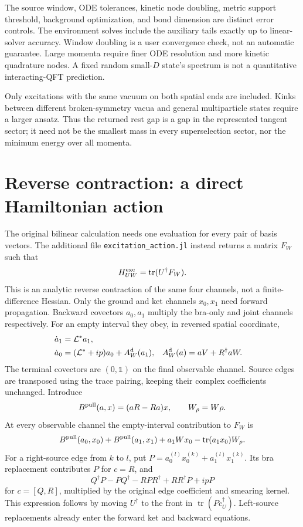 \documentclass[11pt]{article}
\newcommand{\tr}{\operatorname{tr}}
\newcommand{\Id}{\mathbb{1}}
\newcommand{\LL}{\mathcal{L}}
\begin{document}
The source window, ODE tolerances, kinetic node doubling, metric support
threshold, background optimization, and bond dimension are distinct error
controls. The environment solves include the auxiliary tails exactly up to
linear-solver accuracy. Window doubling is a user convergence check, not an
automatic guarantee. Large momenta require finer ODE resolution and more
kinetic quadrature nodes. A fixed random small-$D$ state's spectrum is not
a quantitative interacting-QFT prediction.

Only excitations with the same vacuum on both spatial ends are included.
Kinks between different broken-symmetry vacua and general multiparticle
states require a larger ansatz. Thus the returned rest gap is a gap in the
represented tangent sector; it need not be the smallest mass in every
superselection sector, nor the minimum energy over all momenta.


\section{Reverse contraction: a direct Hamiltonian action}
The original bilinear calculation needs one evaluation for every pair of
basis vectors. The additional file \texttt{excitation\_action.jl} instead
returns a matrix $F_W$ such that
\begin{equation}
 H^{\rm exc}_{UW}=\tr(U^\dagger F_W).
\end{equation}
This is an analytic reverse contraction of the same four channels, not a
finite-difference Hessian. Only the ground and ket channels $x_0,x_1$ need
forward propagation. Backward covectors $a_0,a_1$ multiply the bra-only and
joint channels respectively. For an empty interval they obey, in reversed
spatial coordinate,
\begin{align}
 \dot a_1&=\LL^*a_1,\\
 \dot a_0&=(\LL^*+ip)a_0+A_W^{\rm d}(a_1),
 &A_W^{\rm d}(a)&=aV+R^\dagger aW.
\end{align}
The terminal covectors are $(0,\Id)$ on the final observable channel.
Source edges are transposed using the trace pairing, keeping their complex
coefficients unchanged. Introduce
\begin{equation}
 B^{\rm pull}(a,x)=(aR-Ra)x,\qquad W_\rho=W\rho.
\end{equation}
At every observable channel the empty-interval contribution to $F_W$ is
\begin{equation}
 B^{\rm pull}(a_0,x_0)+B^{\rm pull}(a_1,x_1)
           +a_1Wx_0-\tr(a_1x_0)W_\rho.
 \label{eq:actionbulk}
\end{equation}
For a right-source edge from $k$ to $l$, put
$P=a_0^{(l)}x_0^{(k)}+a_1^{(l)}x_1^{(k)}$. Its bra replacement contributes
$P$ for $c=R$, and
\begin{equation}
 Q^\dagger P-PQ^\dagger-RPR^\dagger+RR^\dagger P+ipP
\end{equation}
for $c=[Q,R]$, multiplied by the original edge coefficient and smearing
kernel. This expression follows by moving $U^\dagger$ to the front in
$\tr(Pc_U^\dagger)$. Left-source replacements already enter the forward ket
and backward equations.
\end{document}
